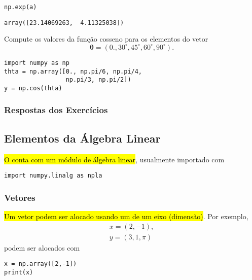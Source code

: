\begin{lstlisting}
np.exp(a)
\end{lstlisting}

\begin{verbatim}
array([23.14069263,  4.11325038])
\end{verbatim}

\begin{exer}
  Compute os valores da função cosseno para os elementos do vetor
  \begin{equation}
    \pmb{\theta} = \left(0., 30^\circ, 45^\circ, 60^\circ, 90^\circ\right).
  \end{equation}
\end{exer}
\begin{resp}
  
\begin{lstlisting}
import numpy as np
thta = np.array([0., np.pi/6, np.pi/4, 
                 np.pi/3, np.pi/2])
y = np.cos(thta)
\end{lstlisting}

\end{resp}

 
\ifisbook 
\subsubsection*{Respostas dos Exercícios}
\shipoutAnswer
\fi


\subsection{Elementos da Álgebra Linear}

\hl{O {\PYTHONnumpy} conta com um módulo de álgebra linear}, usualmente importado com

\begin{lstlisting}
import numpy.linalg as npla
\end{lstlisting}

\subsubsection{Vetores}

\hl{Um vetor podem ser alocado usando um {\PYTHONnumpyDOTarray} de um eixo (dimensão)}. Por exemplo,
\begin{gather}
  x = (2, -1),\\
  y = (3, 1, \pi)
\end{gather}
podem ser alocados com

\begin{lstlisting}
x = np.array([2,-1])
print(x)
\end{lstlisting}

